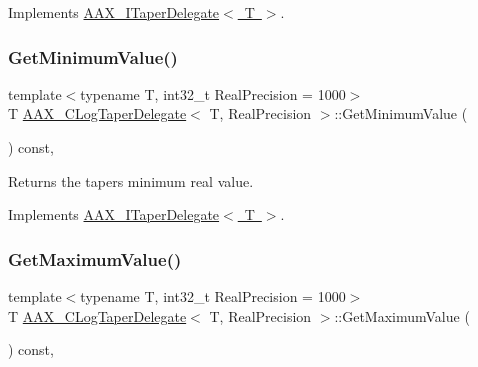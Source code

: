 Implements \mbox{\hyperlink{a01881_a80ce054ca716147155fe0682adf4e469}{A\+A\+X\+\_\+\+I\+Taper\+Delegate$<$ T $>$}}.

\mbox{\label{a01497_a5c142294e18dcfac6069e4e5cf04277f}} 
\subsubsection{\texorpdfstring{GetMinimumValue()}{GetMinimumValue()}}
{\footnotesize\ttfamily template$<$typename T, int32\+\_\+t Real\+Precision = 1000$>$ \\
T \mbox{\hyperlink{a01497}{A\+A\+X\+\_\+\+C\+Log\+Taper\+Delegate}}$<$ T, Real\+Precision $>$\+::Get\+Minimum\+Value (\begin{DoxyParamCaption}{ }\end{DoxyParamCaption}) const\hspace{0.3cm}{\ttfamily [inline]}, {\ttfamily [virtual]}}



Returns the taper\textquotesingle{}s minimum real value. 



Implements \mbox{\hyperlink{a01881_ac51bda25adc6f4ce320c0dd41fa332c7}{A\+A\+X\+\_\+\+I\+Taper\+Delegate$<$ T $>$}}.

\mbox{\label{a01497_a758cba19d16615578682d0c6af7d0496}} 
\subsubsection{\texorpdfstring{GetMaximumValue()}{GetMaximumValue()}}
{\footnotesize\ttfamily template$<$typename T, int32\+\_\+t Real\+Precision = 1000$>$ \\
T \mbox{\hyperlink{a01497}{A\+A\+X\+\_\+\+C\+Log\+Taper\+Delegate}}$<$ T, Real\+Precision $>$\+::Get\+Maximum\+Value (\begin{DoxyParamCaption}{ }\end{DoxyParamCaption}) const\hspace{0.3cm}{\ttfamily [inline]}, {\ttfamily [virtual]}}



